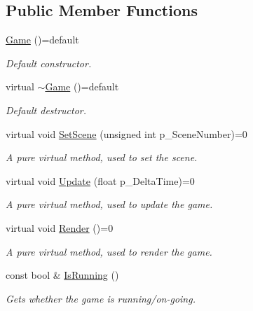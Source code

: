 \subsection*{Public Member Functions}
\begin{DoxyCompactItemize}
\item 
\mbox{\label{class_game_a4735989677c1cab18866f3ae4ee0aa1c}} 
\mbox{\hyperlink{class_game_a4735989677c1cab18866f3ae4ee0aa1c}{Game}} ()=default
\begin{DoxyCompactList}\small\item\em Default constructor. \end{DoxyCompactList}\item 
\mbox{\label{class_game_ab0556d428e8db075b405355af7e81dae}} 
virtual \mbox{\hyperlink{class_game_ab0556d428e8db075b405355af7e81dae}{$\sim$\+Game}} ()=default
\begin{DoxyCompactList}\small\item\em Default destructor. \end{DoxyCompactList}\item 
virtual void \mbox{\hyperlink{class_game_a22579e2500d8552e669ef9349480d960}{Set\+Scene}} (unsigned int p\+\_\+\+Scene\+Number)=0
\begin{DoxyCompactList}\small\item\em A pure virtual method, used to set the scene. \end{DoxyCompactList}\item 
virtual void \mbox{\hyperlink{class_game_ab15084e492f17b36b90314f614b659d3}{Update}} (float p\+\_\+\+Delta\+Time)=0
\begin{DoxyCompactList}\small\item\em A pure virtual method, used to update the game. \end{DoxyCompactList}\item 
\mbox{\label{class_game_a04e3c7ae8a8bbba4f113398467a3896b}} 
virtual void \mbox{\hyperlink{class_game_a04e3c7ae8a8bbba4f113398467a3896b}{Render}} ()=0
\begin{DoxyCompactList}\small\item\em A pure virtual method, used to render the game. \end{DoxyCompactList}\item 
const bool \& \mbox{\hyperlink{class_game_a1fbd99129b2efca859afaaa7f45a62a4}{Is\+Running}} ()
\begin{DoxyCompactList}\small\item\em Gets whether the game is running/on-\/going. \end{DoxyCompactList}\end{DoxyCompactItemize}
